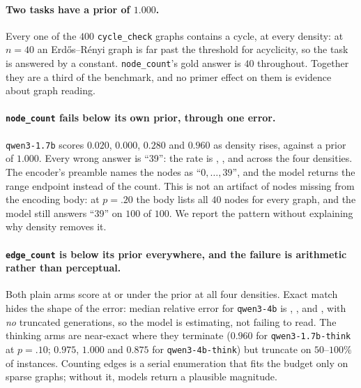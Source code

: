 \documentclass[11pt]{article}
\begin{document}
\paragraph{Two tasks have a prior of $1.000$.} Every one of the $400$
\texttt{cycle\_check} graphs contains a cycle, at every density: at $n{=}40$ an
Erd\H{o}s--R\'enyi graph is far past the threshold for acyclicity, so the task
is answered by a constant. \texttt{node\_count}'s gold answer is $40$
throughout. Together they are a third of the benchmark, and no primer effect on
them is evidence about graph reading.

\paragraph{\texttt{node\_count} fails below its own prior, through one error.}
\texttt{qwen3-1.7b} scores $0.020$, $0.000$, $0.280$ and $0.960$ as density
rises, against a prior of $1.000$. Every wrong answer is ``39'': the rate is
\ncThirtyNinepOne{}, \ncThirtyNinepTwo{}, \ncThirtyNinepThreeFive{} and
\ncThirtyNinepFive{} across
the four densities. The encoder's preamble names the nodes as ``$0,\dots,39$'',
and the model returns the range endpoint instead of the count. This is not an
artifact of nodes missing from the encoding body: at $p{=}.20$ the body lists
all $40$ nodes for every graph, and the model still answers ``39'' on
$100$ of $100$. We report the pattern without explaining why density removes
it.

\paragraph{\texttt{edge\_count} is below its prior everywhere, and the failure
is arithmetic rather than perceptual.} Both plain arms score at or under the
prior at all four densities. Exact match hides the shape of the error: median
relative error for \texttt{qwen3-4b} is \ecRelFourbpOne{}, \ecRelFourbpTwo{}, \ecRelFourbpThreeFive{} and
\ecRelFourbpFive{}, with \emph{no} truncated generations, so the model is estimating,
not failing to read. The thinking arms are near-exact where they terminate
($0.960$ for \texttt{qwen3-1.7b-think} at $p{=}.10$; $0.975$, $1.000$ and
$0.875$ for \texttt{qwen3-4b-think}) but truncate on $50$--$100\%$ of
instances. Counting edges is a serial enumeration that fits the budget only on
sparse graphs; without it, models return a plausible magnitude.
\end{document}
